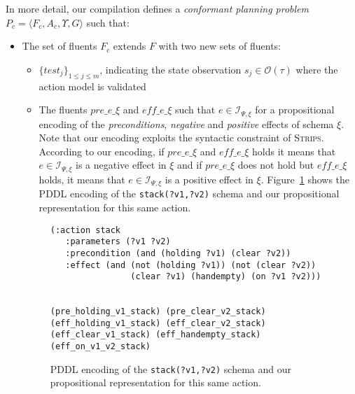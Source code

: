 \documentclass{article}
\newcommand{\tup}[1]{{\langle #1 \rangle}}
\newcommand{\strips}{\textsc{Strips}}
\begin{document}
In more detail, our compilation defines a {\em conformant planning problem} $P_c=\tup{F_c,A_c,\Upsilon,G}$ such that:
\begin{itemize}
\item The set of fluents $F_c$ extends $F$ with two new sets of fluents:
      \begin{itemize}
      \item $\{test_j\}_{1\leq j\leq m}$, indicating the state observation $s_j\in\mathcal{O}(\tau)$ where the action model is validated
      \item The fluents $pre\_e\_\xi$ and $eff\_e\_\xi$ such that $e\in{\mathcal I}_{\Psi,\xi}$ for a propositional encoding of the {\em preconditions}, {\em negative} and {\em positive} effects of schema $\xi$. Note that our encoding exploits the syntactic constraint of \strips. According to our encoding, if $pre\_e\_\xi$ and $eff\_e\_\xi$ holds it means that $e\in{\mathcal I}_{\Psi,\xi}$ is a negative effect in $\xi$ and if $pre\_e\_\xi$ does not hold but $eff\_e\_\xi$ holds, it means that $e\in{\mathcal I}_{\Psi,\xi}$ is a positive effect in $\xi$. Figure~\ref{fig:propositional} shows the PDDL encoding of the {\tt\small stack(?v1,?v2)} schema and our propositional representation for this same action.
      \end {itemize}

\begin{figure}
  \begin{tiny}  
  \begin{verbatim}
(:action stack
   :parameters (?v1 ?v2)
   :precondition (and (holding ?v1) (clear ?v2))
   :effect (and (not (holding ?v1)) (not (clear ?v2))
                (clear ?v1) (handempty) (on ?v1 ?v2)))


(pre_holding_v1_stack) (pre_clear_v2_stack)
(eff_holding_v1_stack) (eff_clear_v2_stack)
(eff_clear_v1_stack) (eff_handempty_stack) (eff_on_v1_v2_stack)
  \end{verbatim}           
  \end{tiny}  
 \caption{\small PDDL encoding of the {\tt\small stack(?v1,?v2)} schema and our propositional representation for this same action.}
\label{fig:propositional}
\end{figure}


\end{itemize}
\end{document}
